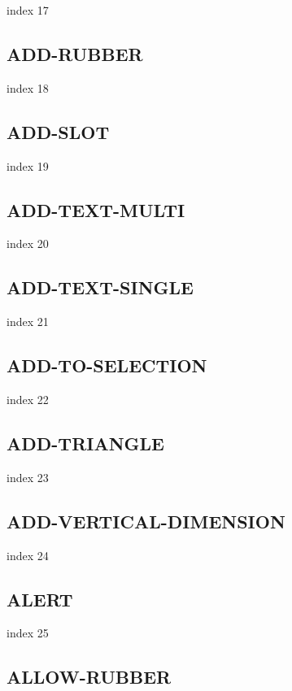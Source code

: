\documentclass[a4paper]{report}
\begin{document}
{{{{{{{{{{{{{index 17

\subsection{ADD-RUBBER}

index 18

\subsection{ADD-SLOT}

index 19

\subsection{ADD-TEXT-MULTI}

index 20

\subsection{ADD-TEXT-SINGLE}

index 21

\subsection{ADD-TO-SELECTION}

index 22

\subsection{ADD-TRIANGLE}

index 23

\subsection{ADD-VERTICAL-DIMENSION}

index 24

\subsection{ALERT}

index 25

\subsection{ALLOW-RUBBER}

}}}}}}}}}}}}}
\end{document}
